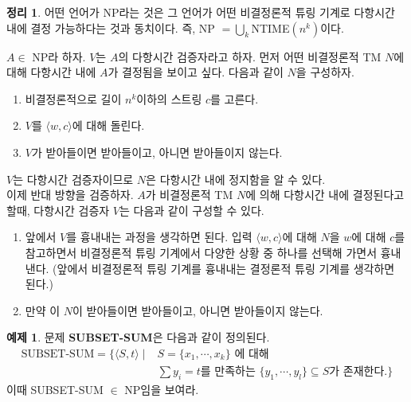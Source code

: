 \documentclass[b5paper]{book}
\theoremstyle{definition}
\newtheorem{thm}{정리}[chapter]
\newtheorem{ex}{예제}[chapter]
\newenvironment{pf*}{\pushQED{\qed}\pf}{\popQED\endpf}
\begin{document}
\begin{thm}
    어떤 언어가 NP라는 것은 그 언어가 어떤 비결정론적 튜링 기계로 다항시간 내에 결정 가능하다는 것과 동치이다.
    즉, NP $= \bigcup_k$NTIME$(n^k)$이다.
\end{thm}
\begin{pf*}
    $A \in $ NP라 하자. $V$는 $A$의 다항시간 검증자라고 하자. 
    먼저 어떤 비결정론적 TM $N$에 대해 다항시간 내에 $A$가 결정됨을 보이고 싶다.
    다음과 같이 $N$을 구성하자.
    \begin{enumerate}
        \item 비결정론적으로 길이 $n^k$이하의 스트링 $c$를 고른다.
        \item $V$를 $\langle w,c \rangle$에 대해 돌린다.
        \item $V$가 받아들이면 받아들이고, 아니면 받아들이지 않는다. 
    \end{enumerate}
    $V$는 다항시간 검증자이므로 $N$은 다항시간 내에 정지함을 알 수 있다. \\ 
    이제 반대 방향을 검증하자. $A$가 비결정론적 TM $N$에 의해 다항시간 내에 결정된다고 할때, 다항시간
    검증자 $V$는 다음과 같이 구성할 수 있다.
    \begin{enumerate}
        \item 앞에서 $V$를 흉내내는 과정을 생각하면 된다. 입력 $\langle w,c \rangle$에 대해 $N$을 $w$에
        대해 $c$를 참고하면서 비결정론적 튜링 기계에서 다양한 상황 중 하나를 선택해 가면서 흉내낸다. (앞에서
        비결정론적 튜링 기계를 흉내내는 결정론적 튜링 기계를 생각하면 된다.) 
        \item 만약 이 $N$이 받아들이면 받아들이고, 아니면 받아들이지 않는다.
    \end{enumerate}
\end{pf*}
\begin{ex}
    문제 \textbf{SUBSET-SUM}은 다음과 같이 정의된다. 
    \begin{align*}
        \text{SUBSET-SUM} = \{\langle S, t \rangle \; \vert \; &S = \{x_1, \cdots , x_k\} \text{ 에 대해 }
        \\ &\sum y_i = t \text{를 만족하는 }\{y_1, \cdots, y_l \} \subseteq S  \text{가 존재한다.} \}
    \end{align*}
    이때 SUBSET-SUM $\in$ NP임을 보여라.
\end{ex}
\end{document}
